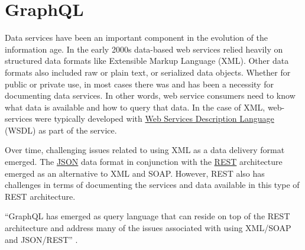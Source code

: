 \section{GraphQL}

Data services have been an important component in the evolution of the 
information age.  In the early 2000s data-based web services relied heavily on
structured data formats like Extensible Markup Language (XML).  Other data 
formats also included raw or plain text, or serialized data objects.  Whether for 
public or private use, in most cases there was and has been a necessity for 
documenting data services.  In other words, web service consumers need to know 
what data is available and how to query that data.  In the case of XML,
web-services were typically developed with \href{https://en.wikipedia.org/wiki/Web_Services_Description_Language}
{Web Services Description Language} (WSDL) as part of the service.  

Over time, challenging issues related to using XML as a data delivery format 
emerged.  The \href{https://en.wikipedia.org/wiki/JSON}{JSON} data format in 
conjunction with the \href{https://en.wikipedia.org/wiki/Representational_state_transfer}{REST} 
architecture emerged as an alternative to XML and SOAP.  However, REST also has 
challenges in terms of documenting the services and data available in this 
type of REST architecture.

``GraphQL has emerged as query language that can reside on top of the REST 
architecture and address many of the issues associated with using XML/SOAP and 
JSON/REST'' \cite{GraphQL2018}.
